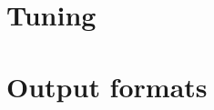 \documentclass[12pt,twoside=semi,a4paper]{scrbook}
\begin{document}
  \chapter{Tuning}
  \label{chapter:tuning}

  
  \newpage
  
  \newpage
  
  \newpage
  
  \newpage
  
  \newpage
  
  \newpage
  
  \newpage
  
  \newpage
  
 
 
 \appendix 
 
 \chapter{Output formats}
  \label{chapter:output}
  
  \newpage
  
  \newpage
  
  
  \newpage
  

 
\end{document}
